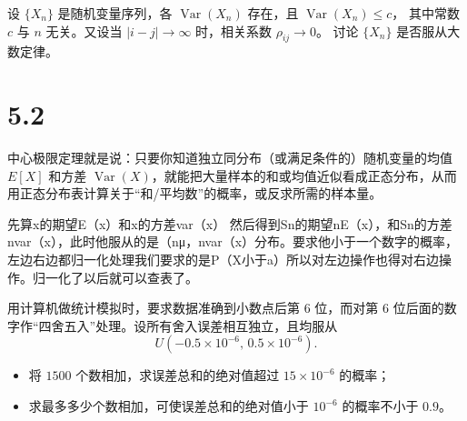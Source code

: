 
\begin{homework}[5.9]
设 $\{X_n\}$ 是随机变量序列，各 $\operatorname{Var}(X_n)$ 存在，且 $\operatorname{Var}(X_n)\le c$，
其中常数 $c$ 与 $n$ 无关。又设当 $|i-j|\to\infty$ 时，相关系数 $\rho_{ij}\to 0$。
讨论 $\{X_n\}$ 是否服从大数定律。
\end{homework}
\section{5.2}
中心极限定理就是说：只要你知道独立同分布（或满足条件的）随机变量的均值 $E[X]$ 和方差 $\operatorname{Var}(X)$，就能把大量样本的和或均值近似看成正态分布，从而用正态分布表计算关于“和/平均数”的概率，或反求所需的样本量。
\begin{dxtips}
    先算x的期望E（x）和x的方差var（x） 然后得到Sn的期望nE（x），和Sn的方差nvar（x），此时他服从的是（nμ，nvar（x）分布。要求他小于一个数字的概率，左边右边都归一化处理我们要求的是P（X小于a）所以对左边操作也得对右边操作。归一化了以后就可以查表了。
\end{dxtips}
\begin{homework}[5.14]
用计算机做统计模拟时，要求数据准确到小数点后第 $6$ 位，而对第 $6$ 位后面的数字作“四舍五入”处理。设所有舍入误差相互独立，且均服从
\[
U(-0.5\times 10^{-6},\,0.5\times 10^{-6}).
\]
\begin{itemize}
  \item[(1)] 将 $1500$ 个数相加，求误差总和的绝对值超过 $15\times 10^{-6}$ 的概率；
  \item[(2)] 求最多多少个数相加，可使误差总和的绝对值小于 $10^{-6}$ 的概率不小于 $0.9$。
\end{itemize}
\end{homework}

